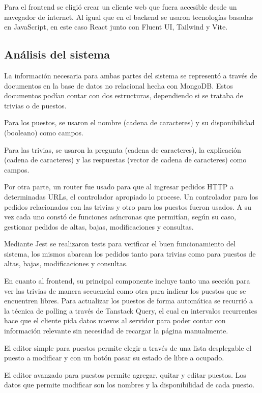 \documentclass{article}
\begin{document}
Para el frontend se eligió crear un cliente web que fuera accesible desde un navegador de internet. Al igual que en el backend se usaron tecnologías basadas en JavaScript, en este caso React junto con Fluent UI, Tailwind y Vite.
\newpage
\subsection{Análisis del sistema}
La información necesaria para ambas partes del sistema se representó a través de documentos en la base de datos no relacional hecha con MongoDB. Estos documentos podían contar con dos estructuras, dependiendo si se trataba de trivias o de puestos.

Para los puestos, se usaron el nombre (cadena de caracteres) y su disponibilidad (booleano) como campos.

Para las trivias, se usaron la pregunta (cadena de caracteres), la explicación (cadena de caracteres) y las respuestas (vector de cadena de caracteres) como campos.

Por otra parte, un router fue usado para que al ingresar pedidos HTTP a determinadas URLs, el controlador apropiado lo procese. Un controlador para los pedidos relacionados con las trivias y otro para los puestos fueron usados. A su vez cada uno constó de funciones asíncronas que permitían, según su caso, gestionar pedidos de altas, bajas, modificaciones y consultas.

Mediante Jest se realizaron tests para verificar el buen funcionamiento del sistema, los mismos abarcan los pedidos tanto para trivias como para puestos de altas, bajas, modificaciones y consultas.

En cuanto al frontend, su principal componente incluye tanto una sección para ver las trivias de manera secuencial como otra para indicar los puestos que se encuentren libres. Para actualizar los puestos de forma automática se recurrió a la técnica de polling a través de Tanstack Query, el cual en intervalos recurrentes hace que el cliente pida datos nuevos al servidor para poder contar con información relevante sin necesidad de recargar la página manualmente.

El editor simple para puestos permite elegir a través de una lista desplegable el puesto a modificar y con un botón pasar su estado de libre a ocupado.

El editor avanzado para puestos permite agregar, quitar y editar puestos. Los datos que permite modificar son los nombres y la disponibilidad de cada puesto.
\end{document}
